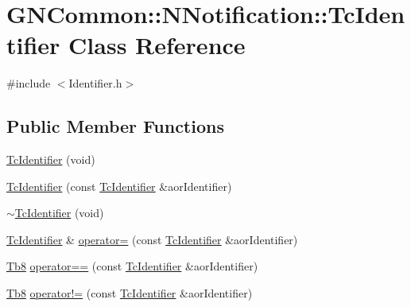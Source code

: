 \hypertarget{class_g_n_common_1_1_n_notification_1_1_tc_identifier}{}\section{G\+N\+Common\+:\+:N\+Notification\+:\+:Tc\+Identifier Class Reference}
\label{class_g_n_common_1_1_n_notification_1_1_tc_identifier}


{\ttfamily \#include $<$Identifier.\+h$>$}

\subsection*{Public Member Functions}
\begin{DoxyCompactItemize}
\item 
\mbox{\hyperlink{class_g_n_common_1_1_n_notification_1_1_tc_identifier_a267c27d2c658da02dd9de307056e5957}{Tc\+Identifier}} (void)
\item 
\mbox{\hyperlink{class_g_n_common_1_1_n_notification_1_1_tc_identifier_a38728e27be5fd22296b49b76bdda619b}{Tc\+Identifier}} (const \mbox{\hyperlink{class_g_n_common_1_1_n_notification_1_1_tc_identifier}{Tc\+Identifier}} \&aor\+Identifier)
\item 
\mbox{\hyperlink{class_g_n_common_1_1_n_notification_1_1_tc_identifier_a24a949696317f638bc14f2fe76443373}{$\sim$\+Tc\+Identifier}} (void)
\item 
\mbox{\hyperlink{class_g_n_common_1_1_n_notification_1_1_tc_identifier}{Tc\+Identifier}} \& \mbox{\hyperlink{class_g_n_common_1_1_n_notification_1_1_tc_identifier_a6a836e2b8afe92c207de676e574009ea}{operator=}} (const \mbox{\hyperlink{class_g_n_common_1_1_n_notification_1_1_tc_identifier}{Tc\+Identifier}} \&aor\+Identifier)
\item 
\mbox{\hyperlink{namespace_g_n_common_a8115dc7ed53b6e5b52e6bfde1632ea74}{Tb8}} \mbox{\hyperlink{class_g_n_common_1_1_n_notification_1_1_tc_identifier_a1250350af717cc758d44354232acbc04}{operator==}} (const \mbox{\hyperlink{class_g_n_common_1_1_n_notification_1_1_tc_identifier}{Tc\+Identifier}} \&aor\+Identifier)
\item 
\mbox{\hyperlink{namespace_g_n_common_a8115dc7ed53b6e5b52e6bfde1632ea74}{Tb8}} \mbox{\hyperlink{class_g_n_common_1_1_n_notification_1_1_tc_identifier_aaeba92963467ea1b7fb123094083633f}{operator!=}} (const \mbox{\hyperlink{class_g_n_common_1_1_n_notification_1_1_tc_identifier}{Tc\+Identifier}} \&aor\+Identifier)
\end{DoxyCompactItemize}
